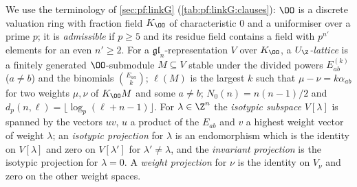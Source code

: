 \begin{definition}\label{pf:sh-curv:uzdef}
We use the terminology of \cref{sec:pf:linkG} (\cref{tab:pf:linkG:clauses}): $\OO$ is a discrete valuation ring with
fraction field $K_\OO$ of characteristic $0$ and a uniformiser over a prime $p$; it is \emph{admissible} if $p\ge5$ and
its residue field contains a field with $p^{n'}$ elements for an even $n'\ge2$. For a $\mathfrak{gl}_n$-representation $V$
over $K_\OO$, a \emph{$U_\Z$-lattice} is a finitely generated $\OO$-submodule $M\subseteq V$ stable under the divided powers
$E^{(k)}_{ab}$ ($a\ne b$) and the binomials $\binom{E_{aa}}{k}$; $\ell(M)$ is the largest $k$ such that $\mu-\nu=k\alpha_{ab}$
for two weights $\mu,\nu$ of $K_\OO M$ and some $a\ne b$; $N_0(n)=n(n-1)/2$ and $d_p(n,\ell)=\lfloor\log_p(\ell+n-1)\rfloor$.
For $\lambda\in\Z^n$ the \emph{isotypic subspace} $V[\lambda]$ is spanned by the vectors $uv$, $u$ a product of the $E_{ab}$
and $v$ a highest weight vector of weight $\lambda$; an \emph{isotypic projection} for $\lambda$ is an endomorphism which is
the identity on $V[\lambda]$ and zero on $V[\lambda']$ for $\lambda'\ne\lambda$, and the \emph{invariant projection} is the
isotypic projection for $\lambda=0$. A \emph{weight projection} for $\nu$ is the identity on $V_\nu$ and zero on the
other weight spaces.
\end{definition}


